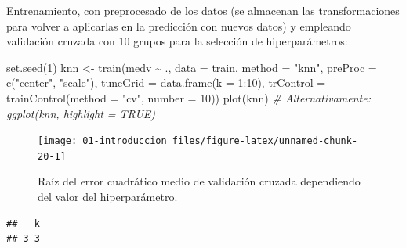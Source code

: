 \documentclass[
  spanish,
]{book}
\newenvironment{Shaded}{\begin{snugshade}}{\end{snugshade}}
\newcommand{\AttributeTok}[1]{\textcolor[rgb]{0.77,0.63,0.00}{#1}}
\newcommand{\CommentTok}[1]{\textcolor[rgb]{0.56,0.35,0.01}{\textit{#1}}}
\newcommand{\DecValTok}[1]{\textcolor[rgb]{0.00,0.00,0.81}{#1}}
\newcommand{\FunctionTok}[1]{\textcolor[rgb]{0.00,0.00,0.00}{#1}}
\newcommand{\NormalTok}[1]{#1}
\newcommand{\OtherTok}[1]{\textcolor[rgb]{0.56,0.35,0.01}{#1}}
\newcommand{\SpecialCharTok}[1]{\textcolor[rgb]{0.00,0.00,0.00}{#1}}
\newcommand{\StringTok}[1]{\textcolor[rgb]{0.31,0.60,0.02}{#1}}
\theoremstyle{break}
\theoremstyle{definition}
\theoremstyle{definition}
\theoremstyle{definition}
\theoremstyle{definition}
\theoremstyle{remark}
\begin{document}
Entrenamiento, con preprocesado de los datos (se almacenan las transformaciones para volver a aplicarlas en la predicción con nuevos datos) y empleando validación cruzada con 10 grupos para la selección de hiperparámetros:

\begin{Shaded}
\begin{Highlighting}[]
\FunctionTok{set.seed}\NormalTok{(}\DecValTok{1}\NormalTok{)}
\NormalTok{knn }\OtherTok{\textless{}{-}} \FunctionTok{train}\NormalTok{(medv }\SpecialCharTok{\textasciitilde{}}\NormalTok{ ., }\AttributeTok{data =}\NormalTok{ train,}
             \AttributeTok{method =} \StringTok{"knn"}\NormalTok{,}
             \AttributeTok{preProc =} \FunctionTok{c}\NormalTok{(}\StringTok{"center"}\NormalTok{, }\StringTok{"scale"}\NormalTok{),}
             \AttributeTok{tuneGrid =} \FunctionTok{data.frame}\NormalTok{(}\AttributeTok{k =} \DecValTok{1}\SpecialCharTok{:}\DecValTok{10}\NormalTok{),}
             \AttributeTok{trControl =} \FunctionTok{trainControl}\NormalTok{(}\AttributeTok{method =} \StringTok{"cv"}\NormalTok{, }\AttributeTok{number =} \DecValTok{10}\NormalTok{))}
\FunctionTok{plot}\NormalTok{(knn) }\CommentTok{\# Alternativamente: ggplot(knn, highlight = TRUE)}
\end{Highlighting}
\end{Shaded}

\begin{figure}[!htb]

{\centering \texttt{[image: 01-introduccion\_files/figure-latex/unnamed-chunk-20-1]} 

}

\caption{Raíz del error cuadrático medio de validación cruzada dependiendo del valor del hiperparámetro.}\label{fig:unnamed-chunk-20}
\end{figure}

\begin{Shaded}
\end{Shaded}

\begin{verbatim}
##   k
## 3 3
\end{verbatim}

\begin{Shaded}
\end{Shaded}
\end{document}
